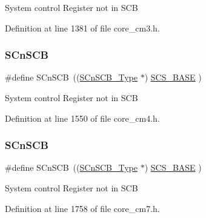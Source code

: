 System control Register not in S\+CB 

Definition at line 1381 of file core\+\_\+cm3.\+h.

\mbox{\label{group___c_m_s_i_s__core__base_ga9fe0cd2eef83a8adad94490d9ecca63f}} 
\subsubsection{\texorpdfstring{S\+Cn\+S\+CB}{SCnSCB}\hspace{0.1cm}{\footnotesize\ttfamily [4/5]}}
{\footnotesize\ttfamily \#define S\+Cn\+S\+CB~((\hyperlink{struct_s_cn_s_c_b___type}{S\+Cn\+S\+C\+B\+\_\+\+Type}    $\ast$)     \hyperlink{group___c_m_s_i_s__core__base_ga3c14ed93192c8d9143322bbf77ebf770}{S\+C\+S\+\_\+\+B\+A\+SE}      )}

System control Register not in S\+CB 

Definition at line 1550 of file core\+\_\+cm4.\+h.

\mbox{\label{group___c_m_s_i_s__core__base_ga9fe0cd2eef83a8adad94490d9ecca63f}} 
\subsubsection{\texorpdfstring{S\+Cn\+S\+CB}{SCnSCB}\hspace{0.1cm}{\footnotesize\ttfamily [5/5]}}
{\footnotesize\ttfamily \#define S\+Cn\+S\+CB~((\hyperlink{struct_s_cn_s_c_b___type}{S\+Cn\+S\+C\+B\+\_\+\+Type}    $\ast$)     \hyperlink{group___c_m_s_i_s__core__base_ga3c14ed93192c8d9143322bbf77ebf770}{S\+C\+S\+\_\+\+B\+A\+SE}      )}

System control Register not in S\+CB 

Definition at line 1758 of file core\+\_\+cm7.\+h.

\mbox{\label{group___c_m_s_i_s__core__base_ga3c14ed93192c8d9143322bbf77ebf770}} 
